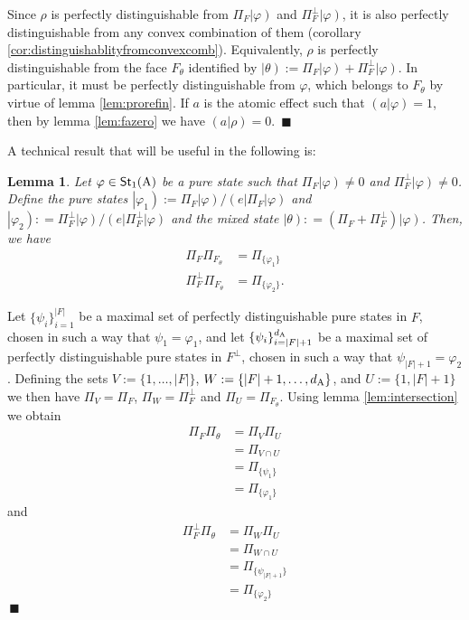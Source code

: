 \documentclass[12pt,aps,pra,showpacs,groupedaddress]{revtex4-1}
\newtheorem{lemma}{Lemma} \newtheorem{proposition}{Proposition}
\def\Proof{\medskip\par\noindent{\bf Proof. }}
\def\qed{$\,\blacksquare$\par}
\def\Stset{{\mathsf{St}}}
\def\K#1{\left|#1\right)}  \def\B#1{\left(#1\right|}
\def\SC#1#2{\left(#1\right|\left.\!#2\right)}  \def\Tr{{\rm Tr}}
\begin{document}
\Proof Since $\rho$ is perfectly distinguishable from $\Pi_F\K \varphi$ and $\Pi^\perp_{F} \K
\varphi$, it is also perfectly distinguishable from any convex combination of them (corollary
\ref{cor:distinguishablityfromconvexcomb}).  Equivalently, $\rho$ is perfectly distinguishable from the face
$F_\theta$ identified by $\K\theta:= \Pi_F \K\varphi + \Pi_{F}^\perp \K \varphi$. In particular, it
must be perfectly distinguishable from $\varphi$, which belongs to $F_\theta$ by virtue of lemma
\ref{lem:prorefin}.  If $a$ is the atomic effect such that $\SC {a} \varphi =1$,
then by lemma \ref{lem:fazero} we have $\SC {a} \rho = 0$. \qed

A technical result that will be useful in the following is:  
\begin{lemma}\label{lem:ultimo,speriamo}
Let $\varphi \in \Stset_1 (\rA)$ be a pure state such that $\Pi_F \K \varphi \not = 0$ and $\Pi_F^\perp \K{\varphi} \not = 0$.   Define the pure states $\K{\varphi_1} :=  \Pi_F  \K \varphi  / \B e  \Pi_F  \K  \varphi $ and  $\K{\varphi_2}: =  \Pi_F^\perp  \K \varphi  /\B e  \Pi^\perp_F \K  \varphi $ and the mixed state $\K \theta : = (\Pi_F  +  \Pi_F^\perp) \K \varphi $. Then, we have 
\begin{align*}
 \Pi_F   \Pi_{F_\theta}  &  =  \Pi_{\{\varphi_1\}}\\
 \Pi_F^\perp   \Pi_{F_\theta} & =  \Pi_{\{\varphi_2\}}.
\end{align*}
\end{lemma}
\Proof Let $\{\psi_i\}_{i=1}^{|F|}$ be a maximal set of perfectly distinguishable pure states in $F$, chosen in such a way that $\psi_1 = \varphi_1$, and let $\{\psi_i\}_{i=|F| +1}^{d_{\rm A}}$ be a maximal set of perfectly distinguishable pure states in $F^\perp$, chosen in such a way that $\psi_{|F|+1} =  \varphi_2$.   Defining the sets $V:=\{  1, \dots, |F|\}$, $W : = \{  |F| +1, \dots, d_{\rm A}\}$, and $U:= \{1, |F| +1\}$ we then have $\Pi_V  =   \Pi_F  $,  $\Pi_W  = \Pi_{F}^\perp$  and $\Pi_U  =  \Pi_{F_\theta}$.  Using lemma \ref{lem:intersection} we obtain 
\begin{align*}
\Pi_F \Pi_\theta  & = \Pi_V \Pi_U  \\
& = \Pi_{V \cap U}  \\
& = \Pi_{\{\psi_1\}}\\
& = \Pi_{\{\varphi_1\}}  
\end{align*} 
and  
\begin{align*}
\Pi_F^\perp \Pi_\theta  & = \Pi_W \Pi_U  \\
& = \Pi_{W \cap U}  \\
& = \Pi_{\{\psi_{|F|  +1}\}}\\
& = \Pi_{\{\varphi_2\}}  
\end{align*} 
\qed
\end{document}

